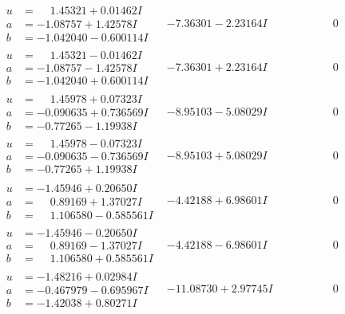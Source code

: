 \documentclass[1p]{elsarticle_modified}
\theoremstyle{definition}
\begin{document}
$$\begin{array}{c|c|c}
\begin{aligned}
u &= \phantom{-}1.45321 + 0.01462 I \\
a &= -1.08757 + 1.42578 I \\
b &= -1.042040 - 0.600114 I\end{aligned}
 & -7.36301 - 2.23164 I & \phantom{-0.000000 } 0 \\ \hline\begin{aligned}
u &= \phantom{-}1.45321 - 0.01462 I \\
a &= -1.08757 - 1.42578 I \\
b &= -1.042040 + 0.600114 I\end{aligned}
 & -7.36301 + 2.23164 I & \phantom{-0.000000 } 0 \\ \hline\begin{aligned}
u &= \phantom{-}1.45978 + 0.07323 I \\
a &= -0.090635 + 0.736569 I \\
b &= -0.77265 - 1.19938 I\end{aligned}
 & -8.95103 - 5.08029 I & \phantom{-0.000000 } 0 \\ \hline\begin{aligned}
u &= \phantom{-}1.45978 - 0.07323 I \\
a &= -0.090635 - 0.736569 I \\
b &= -0.77265 + 1.19938 I\end{aligned}
 & -8.95103 + 5.08029 I & \phantom{-0.000000 } 0 \\ \hline\begin{aligned}
u &= -1.45946 + 0.20650 I \\
a &= \phantom{-}0.89169 + 1.37027 I \\
b &= \phantom{-}1.106580 - 0.585561 I\end{aligned}
 & -4.42188 + 6.98601 I & \phantom{-0.000000 } 0 \\ \hline\begin{aligned}
u &= -1.45946 - 0.20650 I \\
a &= \phantom{-}0.89169 - 1.37027 I \\
b &= \phantom{-}1.106580 + 0.585561 I\end{aligned}
 & -4.42188 - 6.98601 I & \phantom{-0.000000 } 0 \\ \hline\begin{aligned}
u &= -1.48216 + 0.02984 I \\
a &= -0.467979 - 0.695967 I \\
b &= -1.42038 + 0.80271 I\end{aligned}
 & -11.08730 + 2.97745 I & \phantom{-0.000000 } 0 \\ \hline\begin{aligned}

\end{aligned}
\end{array}$$
\end{document}
